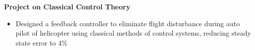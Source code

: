 \documentclass[10pt,a4paper]{extarticle}
\begin{document}
\textbf{Project on Classical Control Theory}
\vspace{-0.5em}
\begin{itemize}[leftmargin = 0.6cm]
\item Designed a feedback controller to eliminate flight disturbance during auto pilot of helicopter using classical methods of control systems, reducing steady state error to 4\%
\end{itemize}
\vspace{-0.4em}
\vspace{-0.2cm}
\end{document}
